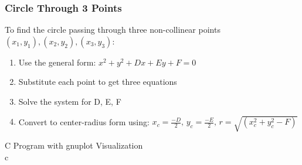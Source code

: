 \documentclass[a4paper,14pt]{article}
\begin{document}
\subsubsection{Circle Through 3 Points}
To find the circle passing through three non-collinear points \((x_1,y_1), (x_2,y_2), (x_3,y_3)\):\\
\begin{enumerate}
\item Use the general form: \(x^2 + y^2 + Dx + Ey + F = 0\)
\item Substitute each point to get three equations
\item Solve the system for D, E, F
\item Convert to center-radius form using: \(x_c = \frac{-D}{2},\, y_c = \frac{-E}{2},\, r = \sqrt{(x_c^2 + y_c^2 - F)} \)
\end{enumerate}
\clearpage
C Program with gnuplot Visualization\\
c
\end{document}
